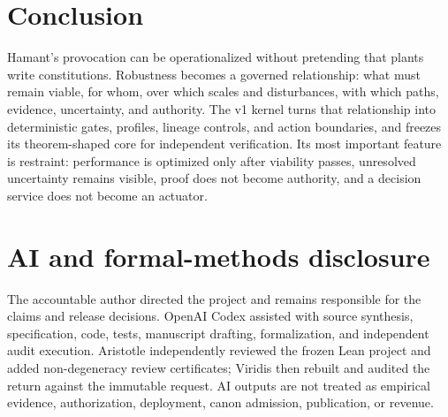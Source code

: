 \documentclass[10pt]{article}
\begin{document}
\section{Conclusion}

Hamant's provocation can be operationalized without pretending that plants
write constitutions. Robustness becomes a governed relationship: what must
remain viable, for whom, over which scales and disturbances, with which paths,
evidence, uncertainty, and authority. The v1 kernel turns that relationship
into deterministic gates, profiles, lineage controls, and action boundaries,
and freezes its theorem-shaped core for independent verification. Its most
important feature is restraint: performance is optimized only after viability
passes, unresolved uncertainty remains visible, proof does not become
authority, and a decision service does not become an actuator.

\section*{AI and formal-methods disclosure}

The accountable author directed the project and remains responsible for the
claims and release decisions. OpenAI Codex assisted with source synthesis,
specification, code, tests, manuscript drafting, formalization, and independent
audit execution. Aristotle independently reviewed the frozen Lean project and
added non-degeneracy review certificates; Viridis then rebuilt and audited the
return against the immutable request. AI outputs are not treated as empirical
evidence, authorization, deployment, canon admission, publication, or revenue.
\end{document}
